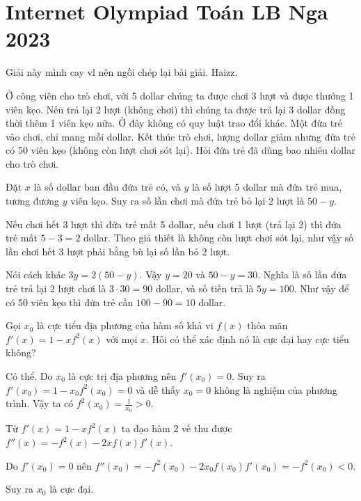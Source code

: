 \section{Internet Olympiad Toán LB Nga 2023}

Giải này mình cay vl nên ngồi chép lại bài giải. Haizz.

\begin{problem}[Bài 1]
    Ở công viên cho trò chơi, với 5 dollar chúng ta được chơi 3 lượt
    và được thưởng 1 viên kẹo. Nếu trả lại 2 lượt (không chơi) thì
    chúng ta được trả lại 3 dollar đồng thời thêm 1 viên kẹo nữa.
    Ở đây không có quy luật trao đổi khác. Một đứa trẻ vào chơi,
    chỉ mang mỗi dollar. Kết thúc trò chơi, lượng dollar giảm
    nhưng đứa trẻ có 50 viên kẹo (không còn lượt chơi sót lại). 
    Hỏi đứa trẻ đã dùng bao nhiêu dollar cho trò chơi.
\end{problem}

\begin{solution}
    Đặt $x$ là số dollar ban đầu đứa trẻ có, và $y$ là số lượt 5 dollar mà đứa trẻ mua, tương đương $y$ viên kẹo. Suy ra số lần chơi mà đứa trẻ bỏ lại 2 lượt là $50-y$. 
    
    Nếu chơi hết 3 lượt thì đứa trẻ mất 5 dollar, nếu chơi 1 lượt (trả lại 2) thì đứa trẻ mất  $5-3=2$ dollar. Theo giả thiết là không còn lượt chơi sót lại, như vậy số lần chơi hết 3 lượt phải bằng bù lại số lần bỏ 2 lượt.
    
    Nói cách khác $3y = 2(50-y)$. Vậy $y=20$ và $50-y=30$. Nghĩa là số lần đứa trẻ trả lại 2 lượt chơi là $3 \cdot 30 = 90$ dollar, và số tiền trả là $5 y = 100$. Như vậy để có 50 viên kẹo thì đứa trẻ cần $100 - 90 = 10$ dollar.
\end{solution}

\begin{problem}[Bài 2]
    Gọi $x_0$ là cực tiểu địa phương của hàm số khả vi $f(x)$ thỏa mãn $f'(x) = 1 - x f^2(x)$ với mọi $x$. Hỏi có thể xác định nó là cực đại hay cực tiểu không?
\end{problem}

\begin{solution}
    Có thể. Do $x_0$ là cực trị địa phương nên $f'(x_0) = 0$.
    Suy ra $f'(x_0) = 1 - x_0 f^2(x_0) = 0$ và dễ thấy $x_0 = 0$
    không là nghiệm của phương trình. Vậy ta có $f^2(x_0) = \frac{1}{x_0} > 0$.

    Từ $f'(x) = 1 - x f^2(x)$ ta đạo hàm 2 vế thu được $f''(x) = -f^2(x) - 2xf(x) f'(x)$. 
    
    Do $f'(x_0) = 0$ nên $f''(x_0) = -f^2(x_0) - 2x_0 f(x_0) f'(x_0) = -f^2(x_0) < 0$.
    
    Suy ra $x_0$ là cực đại.
\end{solution}

